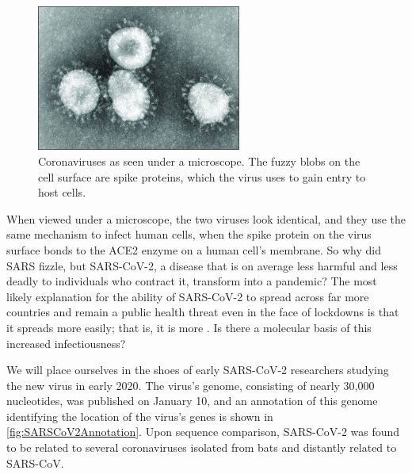\begin{figure}[h]
	\centering
	\mySfFamily
	\includegraphics[width = 0.6\textwidth]{../images_CMYK/coronavirus}
	\caption{Coronaviruses as seen under a microscope. The fuzzy blobs on the cell surface are spike proteins, which the virus uses to gain entry to host cells.}
	\label{fig:coronavirus}
\end{figure}

When viewed under a microscope, the two viruses look identical, and they use the same mechanism to infect human cells, when the spike protein on the virus surface bonds to the ACE2 enzyme on a human cell's membrane. So why did SARS fizzle, but SARS-CoV-2, a disease that is on average less harmful and less deadly to individuals who contract it, transform into a pandemic? The most likely explanation for the ability of SARS-CoV-2 to spread across far more countries and remain a public health threat even in the face of lockdowns is that it spreads more easily; that is, it is more . Is there a molecular basis of this increased infectiousness?

We will place ourselves in the shoes of early SARS-CoV-2 researchers studying the new virus in early 2020. The virus's genome, consisting of nearly 30,000 nucleotides, was published on January 10, and an annotation of this genome identifying the location of the virus's genes is shown in \autoref{fig:SARSCoV2Annotation}. Upon sequence comparison, SARS-CoV-2 was found to be related to several coronaviruses isolated from bats and distantly related to SARS-CoV.

